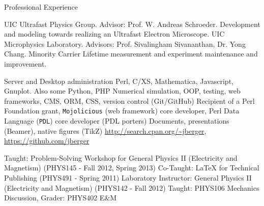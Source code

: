 \begin{rubric}{Professional Experience}


  \entry*[2005 --- \ldots] UIC Ultrafast Physics Group. Advisor: Prof. W. Andreas Schroeder. Development and modeling towards realizing an Ultrafast Electron Microscope.
  \entry*[2003 --- 2005] UIC Microphysics Laboratory. Advisors: Prof. Sivalingham Sivananthan, Dr. Yong Chang. Minority Carrier Lifetime measurement and experiment maintenance and improvement.


  \entry*[Linux] Server and Desktop administration
  \entry*[Languages] Perl, C/XS, Mathematica, Javascript, Gnuplot. Also some Python, PHP
  \entry*[Concepts] Numerical simulation, OOP, testing, web frameworks, CMS, ORM, CSS, version control (Git/GitHub)
  \entry*[Affiliations] Recipient of a Perl Foundation grant, \texttt{Mojolicious} (web framework) core developer, Perl Data Language (\texttt{PDL}) core developer (PDL porters)
  \entry*[\LaTeX] Documents, presentations (Beamer), native figures (TikZ)
  \entry*[Code] \url{http://search.cpan.org/~jberger}, \url{https://github.com/jberger}
  

  \entry*[Teaching] Taught: Problem-Solving Workshop for General Physics II (Electricity and Magnetism) (PHYS145 - Fall 2012, Spring 2013) 
  \entry*[Teaching] Co-Taught: \LaTeX{} for Technical Publishing (PHYS491 - Spring 2011)
  \entry*[T.A.] Laboratory Instructor: General Physics II (Electricity and Magnetism) (PHYS142 - Fall 2012)
  \entry*[T.A.] Taught: PHYS106 Mechanics Discussion, Grader: PHYS402 E\&M

\end{rubric}
